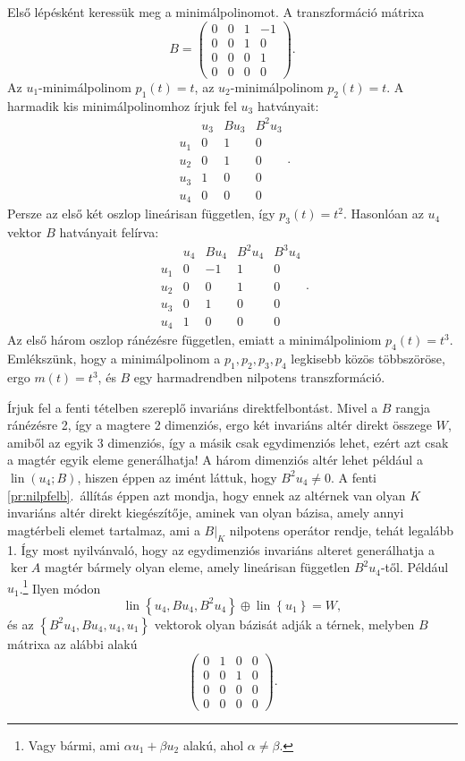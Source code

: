 \documentclass[9pt, a4paper, showtrims]{memoir}
\theoremstyle{plain}
\theoremstyle{remark}
\theoremstyle{definition}
\DeclareMathOperator{\lin}{lin}
\begin{document}
Első lépésként keressük meg a minimálpolinomot.
A transzformáció mátrixa
\[
	B=
	\begin{pmatrix}
		0 & 0 & 1 & -1 \\
		0 & 0 & 1 & 0  \\
		0 & 0 & 0 & 1  \\
		0 & 0 & 0 & 0
	\end{pmatrix}.
\]
Az $u_1$-minimálpolinom $p_1\left( t \right)=t$,
az $u_2$-minimálpolinom $p_2\left( t \right)=t$.
A harmadik kis minimálpolinomhoz írjuk fel $u_3$ hatványait:
\[
	\begin{array}{c|cccc}
		    & u_3 & Bu_3 & B^2u_3 \\
		\hline
		u_1 & 0   & 1    & 0      \\
		u_2 & 0   & 1    & 0      \\
		u_3 & 1   & 0    & 0      \\
		u_4 & 0   & 0    & 0
	\end{array}.
\]
Persze az első két oszlop lineárisan független, így $p_3\left( t \right)=t^2$.
Hasonlóan az $u_4$ vektor $B$ hatványait felírva:
\[
	\begin{array}{c|ccccc}
		    & u_4 & Bu_4 & B^2u_4 & B^3u_4 \\
		\hline
		u_1 & 0   & -1   & 1      & 0      \\
		u_2 & 0   & 0    & 1      & 0      \\
		u_3 & 0   & 1    & 0      & 0      \\
		u_4 & 1   & 0    & 0      & 0
	\end{array}.
\]
Az első három oszlop ránézésre független, emiatt a minimálpoliniom $p_4\left( t \right)=t^3$.
\\
Emlékszünk, hogy a minimálpolinom a $p_1,p_2,p_3,p_4$ legkisebb közös többszöröse,
ergo $m\left( t \right)=t^3$, és $B$ egy harmadrendben nilpotens transzformáció.

Írjuk fel a fenti tételben szereplő invariáns direktfelbontást.
Mivel a $B$ rangja ránézésre 2, így a magtere 2 dimenziós, ergo két invariáns altér direkt összege $W$, amiből
az egyik 3 dimenziós, így a másik csak egydimenziós lehet, ezért azt csak a magtér egyik eleme generálhatja!
A három dimenziós altér lehet például a $\lin(u_4;B)$,
hiszen éppen az imént láttuk, hogy $B^2u_4\neq 0$.
A fenti \ref{pr:nilpfelb}.~állítás éppen azt mondja, hogy ennek az altérnek van olyan $K$ invariáns altér direkt kiegészítője,
aminek van olyan bázisa, amely annyi magtérbeli elemet tartalmaz, ami a $B|_K$ nilpotens operátor rendje, tehát legalább 1.
Így most nyilvánvaló, hogy az
egydimenziós invariáns alteret generálhatja a $\ker A$ magtér bármely olyan eleme,
amely lineárisan független $B^2u_4$-től.
Például $u_1$.\footnote{Vagy bármi, ami $\alpha u_1+\beta u_2$ alakú, ahol $\alpha\neq\beta$.}
Ilyen módon
\[
	\lin\left\{ u_4,Bu_4,B^2u_4 \right\}\oplus
	\lin\left\{ u_1 \right\}
	=
	W,
\]
és az
\(
\left\{
B^2u_4,Bu_4,u_4,u_1
\right\}
\)
vektorok olyan bázisát adják a térnek, melyben $B$ mátrixa az alábbi alakú
\[
	\begin{pmatrix}
		0 & 1 & 0 & 0 \\
		0 & 0 & 1 & 0 \\
		0 & 0 & 0 & 0 \\
		0 & 0 & 0 & 0
	\end{pmatrix}.
\]
\end{document}
